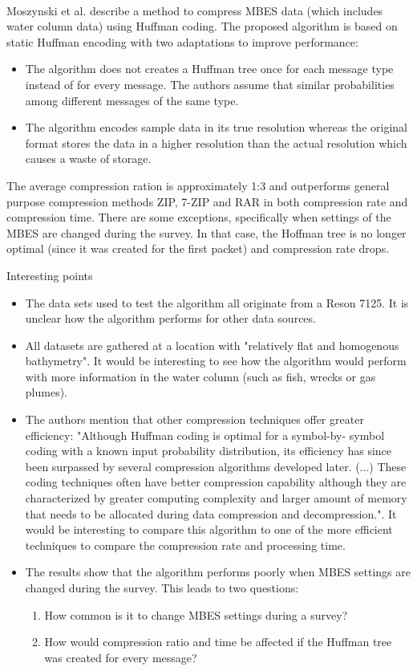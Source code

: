 \cite{moszynski2013novel}\\
Moszynski et al. describe a method to compress MBES data (which includes water column data) using Huffman coding. The proposed algorithm is based on static Huffman encoding with two adaptations to improve performance:
\begin{itemize}
\item The algorithm does not creates a Huffman tree once for each message type instead of for every message. The authors assume that similar probabilities among different messages of the same type. 
\item The algorithm encodes sample data in its true resolution whereas the original format stores the data in a higher resolution than the actual resolution which causes a waste of storage.
\end{itemize}

The average compression ration is approximately 1:3 and outperforms general purpose compression methods ZIP, 7-ZIP and RAR in both compression rate and compression time. 
There are some exceptions, specifically when settings of the MBES are changed during the survey. In that case, the Hoffman tree is no longer optimal (since it was created for the first packet) and compression rate drops.

Interesting points
\begin{itemize}
\item The data sets used to test the algorithm all originate from a Reson 7125. It is unclear how the algorithm performs for other data sources.
\item All datasets are gathered at a location with "relatively flat and homogenous bathymetry". It would be interesting to see how the algorithm would perform with more information in the water column (such as fish, wrecks or gas plumes). 
\item The authors mention that other compression techniques offer greater efficiency: "Although  Huffman  coding  is  optimal  for  a  symbol-by-
symbol  coding  with  a  known  input  probability  distribution,  
its efficiency has since been surpassed by several compression 
algorithms  developed  later.  (...) These coding 
techniques often have better compression capability although 
they are characterized by greater computing complexity and 
larger amount of memory that needs to be allocated during data 
compression and decompression.". It would be interesting to compare this algorithm to one of the more efficient techniques to compare the compression rate and processing time.
\item The results show that the algorithm performs poorly when MBES settings are changed during the survey. This leads to two questions:
\begin{enumerate}
\item How common is it to change MBES settings during a survey?
\item How would compression ratio and time be affected if the Huffman tree was created for every message?
\end{enumerate} 
\end{itemize}